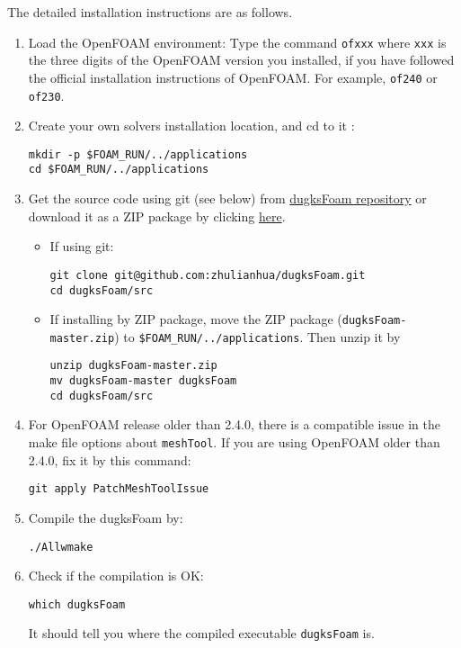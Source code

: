 The detailed installation instructions are as follows.
\begin{enumerate}
\item Load the OpenFOAM environment:
Type the command \texttt{ofxxx} where \texttt{xxx} is the three digits of the OpenFOAM version you installed,
if you have followed the official installation instructions of OpenFOAM. For example, \texttt{of240} or \texttt{of230}.
\item Create your own solvers installation location, and cd to it :
\begin{verbatim}
mkdir -p $FOAM_RUN/../applications
cd $FOAM_RUN/../applications
\end{verbatim}
\item Get the source code using git (see below) from \href{https://github.com/zhulianhua/dugksFoam}{dugksFoam repository}
or download it as a ZIP package by clicking \href{https://github.com/zhulianhua/dugksFoam/archive/master.zip}{here}.
\begin{itemize}
\item If using git:
\begin{verbatim}
git clone git@github.com:zhulianhua/dugksFoam.git
cd dugksFoam/src
\end{verbatim}
\item If installing by ZIP package, move the ZIP package (\texttt{dugksFoam-master.zip}) to \verb|$FOAM_RUN/../applications|. Then unzip it by
\begin{verbatim}
unzip dugksFoam-master.zip
mv dugksFoam-master dugksFoam
cd dugksFoam/src
\end{verbatim}
\end{itemize}

\item For OpenFOAM release older than 2.4.0, there is a compatible issue in the make file options about \verb|meshTool|.
If you are using OpenFOAM older than 2.4.0, fix it by this command:
\begin{verbatim}
git apply PatchMeshToolIssue
\end{verbatim}

\item Compile the dugksFoam by:
\begin{verbatim}
./Allwmake
\end{verbatim}

\item Check if the compilation is OK:
\begin{verbatim}
which dugksFoam
\end{verbatim}
It should tell you where the compiled executable \verb|dugksFoam| is.
\end{enumerate}
%

